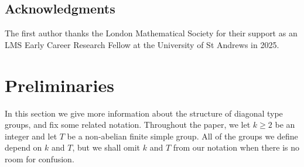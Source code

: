 \documentclass[twoside,a4paper,reqno,11pt]{amsart}
\newcommand{\<}{\langle}
\renewcommand{\>}{\rangle}
\newcommand{\geqs}{\geqslant}
\theoremstyle{definition}
\begin{document}
\subsection*{Acknowledgments}

The first author thanks the London Mathematical Society for their support as an LMS Early Career Research Fellow at the University of St Andrews in 2025.





\section{Preliminaries}\label{sec:prelim}

In this section we give more information about the structure of diagonal type groups, and fix some related notation.
Throughout the paper, we let $k\geqs 2$ be an integer and let $T$ be a non-abelian finite simple group. All of the groups we define depend on $k$ and $T$, but we shall omit $k$ and $T$ from our notation when there is no room for confusion. 
\end{document}
